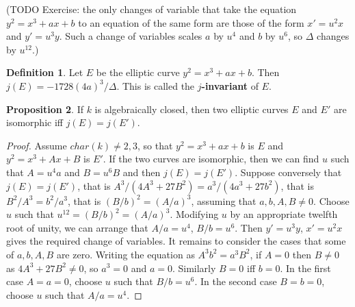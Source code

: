 \documentclass{article}
\newcommand{\rb}[1]{\left( #1 \right)}
\theoremstyle{definition}\newtheorem{definition}{Definition}[section]
\theoremstyle{definition}\newtheorem{remark}[definition]{Remark}
\theoremstyle{definition}\newtheorem*{example}{Example}
\theoremstyle{definition}\newtheorem*{note}{Note}
\newtheorem{proposition}[definition]{Proposition}
\begin{document}
(TODO Exercise: the only changes of variable that take the equation $ y^2 = x^3 + ax + b $ to an equation of the same form are those of the form $ x' = u^2x $ and $ y' = u^3y $. Such a change of variables scales $ a $ by $ u^4 $ and $ b $ by $ u^6 $, so $ \Delta $ changes by $ u^{12} $.)

\begin{definition}
Let $ E $ be the elliptic curve $ y^2 = x^3 + ax + b $. Then $ j\rb{E} = -1728\rb{4a}^3 / \Delta $. This is called the \textbf{$ j $-invariant} of $ E $.
\end{definition}

\begin{proposition}
If $ k $ is algebraically closed, then two elliptic curves $ E $ and $ E' $ are isomorphic iff $ j\rb{E} = j\rb{E'} $.
\end{proposition}

\begin{proof}
Assume $ char\rb{k} \ne 2, 3 $, so that $ y^2 = x^3 + ax + b $ is $ E $ and $ y^2 = x^3 + Ax + B $ is $ E' $. If the two curves are isomorphic, then we can find $ u $ such that $ A = u^4a $ and $ B = u^6B $ and then $ j\rb{E} = j\rb{E'} $. Suppose conversely that $ j\rb{E} = j\rb{E'} $, that is $ A^3 / \rb{4A^3 + 27B^2} = a^3 / \rb{4a^3 + 27b^2} $, that is $ B^2 / A^3 = b^2 / a^3 $, that is $ \rb{B / b}^2 = \rb{A / a}^3 $, assuming that $ a, b, A, B \ne 0 $. Choose $ u $ such that $ u^{12} = \rb{B / b}^2 = \rb{A / a}^3 $. Modifying $ u $ by an appropriate twelfth root of unity, we can arrange that $ A / a = u^4 $, $ B / b = u^6 $. Then $ y' = u^3y $, $ x' = u^2x $ gives the required change of variables. It remains to consider the cases that some of $ a, b, A, B $ are zero. Writing the equation as $ A^3b^2 = a^3B^2 $, if $ A = 0 $ then $ B \ne 0 $ as $ 4A^3 + 27B^2 \ne 0 $, so $ a^3 = 0 $ and $ a = 0 $. Similarly $ B = 0 $ iff $ b = 0 $. In the first case $ A = a = 0 $, choose $ u $ such that $ B / b = u^6 $. In the second case $ B = b = 0 $, choose $ u $ such that $ A / a = u^4 $.
\end{proof}
\end{document}
